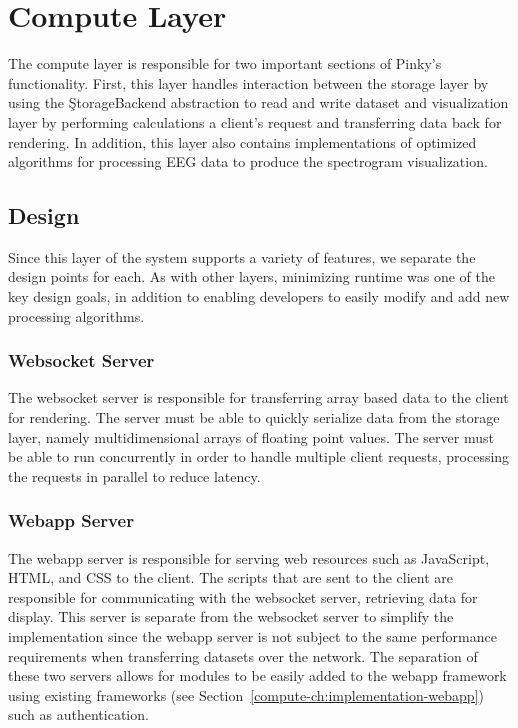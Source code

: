 \chapter{Compute Layer}\label{compute-ch}

The compute layer is responsible for two important sections of Pinky's
functionality. First, this layer handles interaction between the storage layer
by using the \c{StorageBackend} abstraction to read and write dataset and
visualization layer by performing calculations a client's request and
transferring data back for rendering. In addition, this layer also contains
implementations of optimized algorithms for processing EEG data to produce the
spectrogram visualization.

\section{Design}

Since this layer of the system supports a variety of features, we separate the
design points for each. As with other layers, minimizing runtime was one of the
key design goals, in addition to enabling developers to easily modify and add
new processing algorithms.

\subsection{Websocket Server}

The websocket server is responsible for transferring array based data to the
client for rendering. The server must be able to quickly serialize data from
the storage layer, namely multidimensional arrays of floating point values. The
server must be able to run concurrently in order to handle multiple client
requests, processing the requests in parallel to reduce latency.

\subsection{Webapp Server}

The webapp server is responsible for serving web resources such as JavaScript,
HTML, and CSS to the client. The scripts that are sent to the client are
responsible for communicating with the websocket server, retrieving data for
display. This server is separate from the websocket server to simplify the
implementation since the webapp server is not subject to the same performance
requirements when transferring datasets over the network. The separation of
these two servers allows for modules to be easily added to the webapp framework
using existing frameworks (see Section~\ref{compute-ch:implementation-webapp})
such as authentication.

